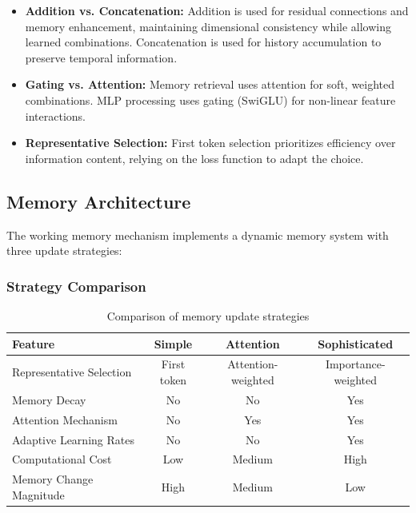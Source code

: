 \documentclass{article}
\begin{document}
\begin{itemize}
\item \textbf{Addition vs. Concatenation:} Addition is used for residual connections and memory enhancement, maintaining dimensional consistency while allowing learned combinations. Concatenation is used for history accumulation to preserve temporal information.

\item \textbf{Gating vs. Attention:} Memory retrieval uses attention for soft, weighted combinations. MLP processing uses gating (SwiGLU) for non-linear feature interactions.

\item \textbf{Representative Selection:} First token selection prioritizes efficiency over information content, relying on the loss function to adapt the choice.

\end{itemize}

\subsection{Memory Architecture}

The working memory mechanism implements a dynamic memory system with three update strategies:

\subsubsection{Strategy Comparison}

\begin{table}[h]
\centering
\begin{tabular}{|l|c|c|c|}
\hline
\textbf{Feature} & \textbf{Simple} & \textbf{Attention} & \textbf{Sophisticated} \\
\hline
Representative Selection & First token & Attention-weighted & Importance-weighted \\
Memory Decay & No & No & Yes \\
Attention Mechanism & No & Yes & Yes \\
Adaptive Learning Rates & No & No & Yes \\
Computational Cost & Low & Medium & High \\
Memory Change Magnitude & High & Medium & Low \\
\hline
\end{tabular}
\caption{Comparison of memory update strategies}
\end{table}
\end{document}
